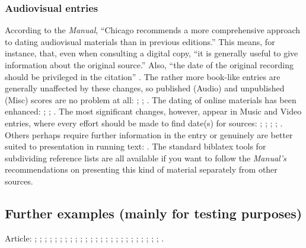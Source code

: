\documentclass[a4paper,12pt]{report}
\begin{document}
\subsubsection*{Audiovisual entries}
\label{sec:audiovisual}

According to the \emph{Manual}, \enquote{Chicago recommends a more
  comprehensive approach to dating audiovisual materials than in
  previous editions.}  This means, for instance, that, even when
consulting a digital copy, \enquote{it is generally useful to give
  information about the original source.}  Also, \enquote{the date of
  the original recording should be privileged in the citation}
\autocite[15.53]{chicago:manual}.  The rather more book-like entries
are generally unaffected by these changes, so published
(\textsf{Audio}) and unpublished (\textsf{Misc}) scores are no problem
at all: \autocite{schubert:muellerin}; \autocite{verdi:corsaro};
\autocite{shapey:partita}.  The dating of online materials has been
enhanced: \autocite{coolidge:speech}; \autocite{horowitz:youtube};
\autocite{pollan:plant}.  The most significant changes, however,
appear in \textsf{Music} and \textsf{Video} entries, where every
effort should be made to find date(s) for sources:
\autocite{auden:reading}; \autocite{friends:leia};
\autocite{handel:messiah}; \autocite{holiday:fool};
\autocite{nytrumpet:art}.  Others perhaps require further information
in the entry or genuinely are better suited to presentation in running
text: \autocite{beethoven:sonata29}.  The standard \textsf{biblatex}
tools for subdividing reference lists are all available if you want to
follow the \emph{Manual's} recommendations on presenting this kind of
material separately from other sources.

\subsection*{Further examples (mainly for testing purposes)}
\label{testing}

Article: \autocite{assocpress:gun}; \autocite{brown:bremer};
\autocite{chu:panda}; \autocite{conley:fifthgrade};
\autocite{connell:chronic}; \autocite{ellis:blog};
\autocite{friedman:learning}; \autocite{garaud:gatine};
\autocite{garrett}; \autocite{gibbard}; \autocite{kern};
\autocite{kimluu:diethyl}; \autocite{lewis}; \autocite{loften:hamlet};
\autocite{loomis:structure}; \autocite{morgenson:market};
\autocite{osborne:poison}; \autocite{reaves:rosen};
\autocite{rozner:liberation}; \autocite{schneider:mittelpleistozaene};
\autocite{sewall:letter}; \autocite{stenger:privacy};
\autocite{terborgh:preservation}; \autocite{wall:radio};
\autocite{warr:ellison}; \autocite{white:callimachus}.
\end{document}
